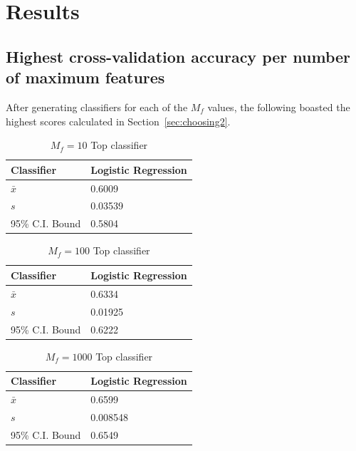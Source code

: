 \documentclass[11pt]{article}
\begin{document}
\section{Results}\label{sec:results}

\subsection{Highest cross-validation accuracy per number of maximum features}\label{sec:mfresults}

After generating classifiers for each of the $M_f$ values, 
the following boasted the highest scores calculated in Section~\ref{sec:choosing2}.

\begin{table}[H]
	\begin{center}
		\begin{tabular}{|l|l|}			
			\hline
			Classifier & Logistic Regression \\
			\hline\hline
			$\bar{x}$ &  0.6009\\
			$s$ &  0.03539 \\
			95\% C.I. Bound & 0.5804 \\
			\hline
		\end{tabular}
		\caption{$M_f = 10$ Top classifier}
		\label{tbl:mf10}
	\end{center}
\end{table}

\begin{table}[H]
	\begin{center}
		\begin{tabular}{|l|l|}			
			\hline
			Classifier & Logistic Regression \\
			\hline\hline
			$\bar{x}$ &  0.6334\\
			$s$ &  0.01925 \\
			95\% C.I. Bound & 0.6222 \\
			\hline
		\end{tabular}
		\caption{$M_f = 100$ Top classifier}
		\label{tbl:mf100}
	\end{center}
\end{table}

\begin{table}[H]
	\begin{center}
		\begin{tabular}{|l|l|}			
			\hline
			Classifier & Logistic Regression \\
			\hline\hline
			$\bar{x}$ &  0.6599\\
			$s$ &  0.008548 \\
			95\% C.I. Bound & 0.6549 \\
			\hline
		\end{tabular}
		\caption{$M_f = 1000$ Top classifier}
		\label{tbl:mf1000}
	\end{center}
\end{table}
\end{document}

